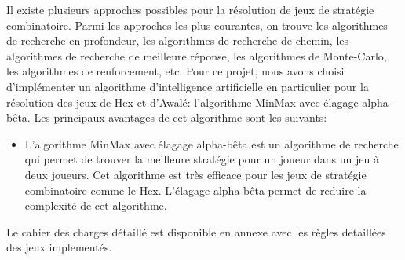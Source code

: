 Il existe plusieurs approches possibles pour la résolution de jeux de stratégie
combinatoire. Parmi les approches les plus courantes, on trouve les algorithmes
de recherche en profondeur, les algorithmes de recherche de chemin, les
algorithmes de recherche de meilleure réponse, les algorithmes de Monte-Carlo,
les algorithmes de renforcement, etc.
Pour ce projet, nous avons choisi d'implémenter un algorithme d'intelligence artificielle 
en particulier pour la résolution des jeux de Hex et d'Awalé: l'algorithme MinMax avec élagage
alpha-bêta.
Les principaux avantages de cet algorithme sont les suivants:
\begin{itemize}
	\item L'algorithme MinMax avec élagage alpha-bêta est un algorithme de recherche
	qui permet de trouver la meilleure stratégie pour un joueur dans un jeu à deux
	joueurs. Cet algorithme est très efficace pour les jeux de stratégie combinatoire
	comme le Hex. L'élagage alpha-bêta permet de reduire la complexité de cet algorithme.
\end{itemize}

Le cahier des charges détaillé est disponible en annexe avec les règles detaillées des jeux implementés.
